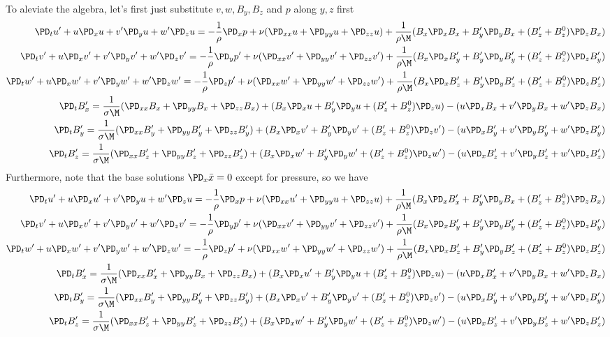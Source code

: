 \documentclass[11pt]{article}
\begin{document}
To aleviate the algebra, let's first just substitute $v,w,B_y,B_z$ and $p$ along $y,z$ first
\begin{equation}\begin{aligned}
\PD_t u'+ u\PD_x u  + v'\PD_y u  + w'\PD_z u  = -\frac{1}{\rho}\PD_x p + \nu (\PD_{xx} u +\PD_{yy} u +\PD_{zz} u ) + \frac{1}{\rho \M} (B_x \PD_x B_x  + B_y' \PD_y B_x  + (B_z'+B_z^0) \PD_z B_x ) \\
\PD_t v'+ u\PD_x v' + v'\PD_y v' + w'\PD_z v' = -\frac{1}{\rho}\PD_y p'+ \nu (\PD_{xx} v'+\PD_{yy} v'+\PD_{zz} v') + \frac{1}{\rho \M} (B_x \PD_x B_y' + B_y' \PD_y B_y' + (B_z'+B_z^0) \PD_z B_y') \\
\PD_t w'+ u\PD_x w' + v'\PD_y w' + w'\PD_z w' = -\frac{1}{\rho}\PD_z p'+ \nu (\PD_{xx} w'+\PD_{yy} w'+\PD_{zz} w') + \frac{1}{\rho \M} (B_x \PD_x B_z' + B_y' \PD_y B_z' + (B_z'+B_z^0) \PD_z B_z') \\
\PD_t B_x' = \frac{1}{\sigma \M} (\PD_{xx} B_x  + \PD_{yy} B_x +\PD_{zz} B_x ) + (B_x\PD_x u +B_y'\PD_y u +(B_z'+B_z^0)\PD_z u ) - (u\PD_x B_x +v'\PD_y B_x +w'\PD_z B_x ) \\
\PD_t B_y' = \frac{1}{\sigma \M} (\PD_{xx} B_y' + \PD_{yy} B_y'+\PD_{zz} B_y') + (B_x\PD_x v'+B_y'\PD_y v'+(B_z'+B_z^0)\PD_z v') - (u\PD_x B_y'+v'\PD_y B_y'+w'\PD_z B_y') \\
\PD_t B_z' = \frac{1}{\sigma \M} (\PD_{xx} B_z' + \PD_{yy} B_z'+\PD_{zz} B_z') + (B_x\PD_x w'+B_y'\PD_y w'+(B_z'+B_z^0)\PD_z w') - (u\PD_x B_z'+v'\PD_y B_z'+w'\PD_z B_z') \\
\end{aligned} \end{equation}
Furthermore, note that the base solutions $\PD_x \bar{x} = 0$ except for pressure, so we have
\begin{equation}\begin{aligned}
\PD_t u'+ u\PD_x u' + v'\PD_y u  + w'\PD_z u  = -\frac{1}{\rho}\PD_x p + \nu (\PD_{xx} u'+\PD_{yy} u +\PD_{zz} u ) + \frac{1}{\rho \M} (B_x \PD_x B_x' + B_y' \PD_y B_x  + (B_z'+B_z^0) \PD_z B_x ) \\
\PD_t v'+ u\PD_x v' + v'\PD_y v' + w'\PD_z v' = -\frac{1}{\rho}\PD_y p'+ \nu (\PD_{xx} v'+\PD_{yy} v'+\PD_{zz} v') + \frac{1}{\rho \M} (B_x \PD_x B_y' + B_y' \PD_y B_y' + (B_z'+B_z^0) \PD_z B_y') \\
\PD_t w'+ u\PD_x w' + v'\PD_y w' + w'\PD_z w' = -\frac{1}{\rho}\PD_z p'+ \nu (\PD_{xx} w'+\PD_{yy} w'+\PD_{zz} w') + \frac{1}{\rho \M} (B_x \PD_x B_z' + B_y' \PD_y B_z' + (B_z'+B_z^0) \PD_z B_z') \\
\PD_t B_x' = \frac{1}{\sigma \M} (\PD_{xx} B_x' + \PD_{yy} B_x +\PD_{zz} B_x ) + (B_x\PD_x u'+B_y'\PD_y u +(B_z'+B_z^0)\PD_z u ) - (u\PD_x B_x'+v'\PD_y B_x +w'\PD_z B_x ) \\
\PD_t B_y' = \frac{1}{\sigma \M} (\PD_{xx} B_y' + \PD_{yy} B_y'+\PD_{zz} B_y') + (B_x\PD_x v'+B_y'\PD_y v'+(B_z'+B_z^0)\PD_z v') - (u\PD_x B_y'+v'\PD_y B_y'+w'\PD_z B_y') \\
\PD_t B_z' = \frac{1}{\sigma \M} (\PD_{xx} B_z' + \PD_{yy} B_z'+\PD_{zz} B_z') + (B_x\PD_x w'+B_y'\PD_y w'+(B_z'+B_z^0)\PD_z w') - (u\PD_x B_z'+v'\PD_y B_z'+w'\PD_z B_z') \\
\end{aligned} \end{equation}
\end{document}
